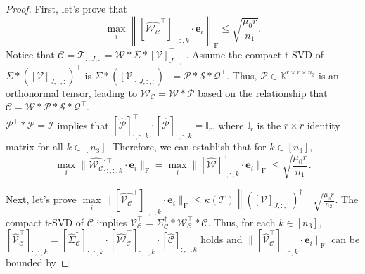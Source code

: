\documentclass[twoside,12pt]{article}
\def\fro{{\mathrm{F}}}
\def\fro{{\mathrm{F}}}
\begin{document}
\begin{proof}
 First, let's prove that \[\max_{i}\left\|[\widehat{\mathcal{W}_{\mathcal{C}}}^{\top}]_{:,:,k} \cdot \mathbf{e}_i\right\|_{\fro}\leq \sqrt{\frac{\mu_{0}r}{n_1}}.\] 
Notice that $\mathcal{C}=\mathcal{T}_{:, J,:}=\mathcal{W} * \Sigma *[\mathcal{V}]_{J,:,:}^{\top}$. Assume the compact t-SVD of $\Sigma *\left([\mathcal{V}]_{J,:,:}\right)^{\top}$ is   $\Sigma *\left([\mathcal{V}]_{J,:,:}\right)^{\top}=\mathcal{P} * \mathcal{S} * \mathcal{Q}^{\top}$. Thus, $\mathcal{P}\in\mathbb{K}^{r\times r\times n_3}$ is an orthonormal tensor, leading to $\mathcal{W}_{\mathcal{C}}=\mathcal{W} * \mathcal{P}$ based on the relationship that $\mathcal{C}=\mathcal{W} * \mathcal{P}*\mathcal{S}*\mathcal{Q}^{\top}$.\\
 $\mathcal{P}^{\top}*\mathcal{P} = \mathcal{I}$ implies that $[\widehat{\mathcal{P}}]_{:,:,k}^{\top}\cdot[\widehat{\mathcal{P}}]_{:,:,k} = \mathbb{I}_r$, where $\mathbb{I}_r$ is the $r\times r$ identity matrix for all $k\in[n_3]$. 
Therefore, we can establish that for $k\in[n_3]$,
\begin{equation}\label{eqn:leftincohereceofC}
\max\limits_{i}\| \widehat{\mathcal{W}_{\mathcal{C}}}]_{:,:,k}^{\top}\cdot \mathbf{e}_i\|_{\fro} =
\max\limits_{i}\| [\widehat{\mathcal{W}}]_{:,:,k}^{\top}\cdot \mathbf{e}_i\|_{\fro} \leq \sqrt{\frac{\mu_{0}r}{n_1}}.
\end{equation}

\noindent Next, let's prove $\max\limits_{i}\|[\widehat{\mathcal{V}_{\mathcal{C}}}^{\top}]_{:,:,k}\cdot \mathbf{e}_{i}\|_{\fro}\leq \kappa(\mathcal{T})\left\|([\mathcal{V}]_{J,:,:})^{\dagger}\right\| \sqrt{\frac{\mu_0 r}{n_2}}$.  The compact t-SVD of $\mathcal{C}$ implies $\mathcal{V}_{\mathcal{C}}^{\top} = \Sigma_{\mathcal{C}}^{\dagger}*\mathcal{W}_{\mathcal{C}}^{\top}*\mathcal{C}$. 
 Thus,   for each $k\in[n_3]$,
$[\widehat{\mathcal{V}}_{\mathcal{C}}^{\top}]_{:,:,k} = [\widehat{\Sigma}_{\mathcal{C}}^{\dagger}]_{:,:,k} \cdot [\widehat{\mathcal{W}}_{\mathcal{C}}^{\top}]_{:,:,k}\cdot [\widehat{\mathcal{C}}]_{:,:,k}$ holds and  $\|[\widehat{\mathcal{V}}_{\mathcal{C}}^\top]_{:,:,k}\cdot \mathbf{e}_i\|_{\fro}$ can be bounded by


\end{proof}
\end{document}
